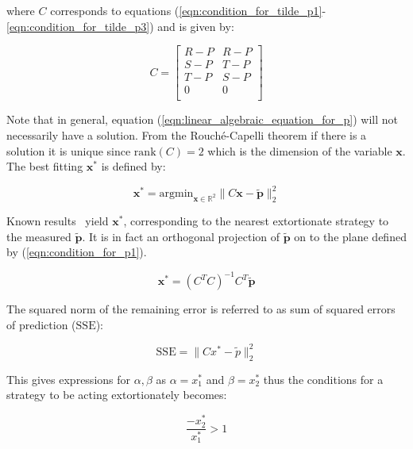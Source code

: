 \documentclass[a4paper]{article}
\newcommand{\SSe}{\text{SSE}}
\begin{document}
where \(C\) corresponds to equations
(\ref{eqn:condition_for_tilde_p1}-\ref{eqn:condition_for_tilde_p3}) and is
given by:

\begin{equation}\label{eqn:definition_of_C}
    C =
    \begin{bmatrix}
        R - P & R- P \\
        S - P & T- P \\
        T - P & S- P \\
        0     & 0 \\
    \end{bmatrix}
\end{equation}

Note that in general, equation (\ref{eqn:linear_algebraic_equation_for_p}) will
not necessarily have a solution. From the Rouch\'{e}-Capelli theorem if there is
a solution it is unique since \(\text{rank}(C)=2\) which is the dimension of the
variable \(\textbf{x}\). The best fitting \(\textbf{x}^*\) is defined by:

\begin{equation}\label{eqn:x_star}
    \textbf{x}^* = \text{argmin}_{\textbf{x}\in\mathbb{R}^2}\|C \textbf{x}- \tilde{\textbf{p}}\|_2^2
\end{equation}

Known results~\cite{kutner2004applied, rao1973linear, wakefield2013bayesian}
yield \(\textbf{x}^*\), corresponding to the nearest extortionate strategy to the measured
\(\tilde{\textbf{p}}\). It is in fact an orthogonal projection of
\(\tilde{\textbf{p}}\) on to the
plane defined by (\ref{eqn:condition_for_p1}).

\begin{equation}\label{eqn:x_star_formula}
    \textbf{x}^* = {\left(C^{T}C\right)}^{-1}C^{T}\tilde{\textbf{p}}
\end{equation}

The squared norm of the remaining error is referred to as sum of squared errors
of prediction (\(\SSe\)):

\begin{equation}\label{eqn:r_squared}
    \SSe = \|C x^*- \tilde p\|_2^2
\end{equation}

This gives expressions for \(\alpha, \beta\) as \(\alpha=x^*_1\) and
\(\beta=x^*_2\) thus the conditions for a strategy to be acting extortionately
becomes:

\begin{equation}
    \frac{-x^*_2}{x^*_1} > 1
        \label{eqn:measured_condition_for_chi}
\end{equation}
\end{document}
